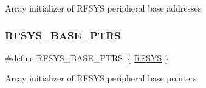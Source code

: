 Array initializer of R\+F\+S\+YS peripheral base addresses \mbox{\label{group___r_f_s_y_s___peripheral___access___layer_ga59f6caa8732744ac3a9f91828ec2daa1}} 
\subsubsection{\texorpdfstring{RFSYS\_BASE\_PTRS}{RFSYS\_BASE\_PTRS}}
{\footnotesize\ttfamily \#define R\+F\+S\+Y\+S\+\_\+\+B\+A\+S\+E\+\_\+\+P\+T\+RS~\{ \mbox{\hyperlink{group___r_f_s_y_s___peripheral___access___layer_ga83a5a75f5421c69ce93437b8be3c1144}{R\+F\+S\+YS}} \}}

Array initializer of R\+F\+S\+YS peripheral base pointers 